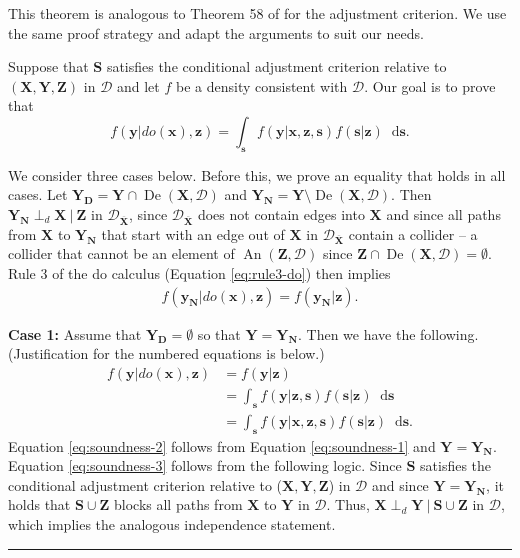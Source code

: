 \documentclass[twoside]{article}
\DeclareMathOperator{\An}{An}
\DeclareMathOperator{\De}{De}
\newcommand\given[1][]{\:#1\vert\:}
\newcommand{\mb}[1]{\mathbf{#1}}
\newcommand{\dsepp}{\perp_{d}}
\newcommand{\g}[1][G]{\mathcal{#1}}
\newcommand*\diff{\mathop{}\!\mathrm{d}}
\newenvironment{proofof}[1][]{\begin{trivlist}
\item[\hskip \labelsep {\bfseries Proof of #1.}]}{\hfill\BlackBox\end{trivlist}}
\newcommand{\BlackBox}{\rule{1.5ex}{1.5ex}}
\begin{document}
\begin{proofof}[Theorem \ref{thm:soundness}] 
    This theorem is analogous to Theorem 58 of \cite{perkovic2018complete} for the adjustment criterion. We use the same proof strategy and adapt the arguments to suit our needs.

    Suppose that $\mb{S}$ satisfies the conditional adjustment criterion relative to $(\mb{X,Y,Z})$ in $\g[D]$ and let $f$ be a density consistent with $\g[D]$. Our goal is to prove that
    \begin{equation}
        {f(\mb{y} | do(\mb{x}), \mb{z}) = \int_{\mb{s}} f(\mb{y} | \mb{x,z,s}) f(\mb{s} | \mb{z}) \diff \mb{s}.}
    \end{equation}

    We consider three cases below. Before this, we prove an equality that holds in all cases. Let $\mb{Y_D} = \mb{Y} \cap \De(\mb{X},\g[D])$ and $\mb{Y_N} = \mb{Y} \setminus \De(\mb{X}, \g[D])$. Then $\mb{Y_N} \dsepp \mb{X} \given \mb{Z}$ in $\g[D]_{\overline{\mb{X}}}$, since $\g[D]_{\overline{\mb{X}}}$ does not contain edges into $\mb{X}$ and since all paths from $\mb{X}$ to $\mb{Y_N}$ that start with an edge out of $\mb{X}$ in $\g[D]_{\overline{\mb{X}}}$ contain a collider -- a collider that cannot be an element of $\An(\mb{Z},\g[D])$ since $\mb{Z} \cap \De(\mb{X}, \g[D]) = \emptyset$. Rule 3 of the do calculus (Equation \eqref{eq:rule3-do}) then implies
    \begin{align}
        {f(\mb{y_N} | do(\mb{x}), \mb{z}) = f(\mb{y_N} | \mb{z}).} \label{eq:soundness-1}
    \end{align}


    \textbf{Case 1:} Assume that $\mb{Y_D} = \emptyset$ so that $\mb{Y} = \mb{Y_N}$. Then we have the following. (Justification for the numbered equations is below.)
    \begin{align}
        f(\mb{y} | do(\mb{x}) , \mb{z})
            &= f(\mb{y} | \mb{z}) \label{eq:soundness-2}\\
            &= \int_{\mb{s}} f(\mb{y} | \mb{z, s}) f(\mb{s} | \mb{z}) \diff \mb{s} \nonumber \\
            &= \int_{\mb{s}} f(\mb{y} | \mb{x, z, s}) f(\mb{s} | \mb{z}) \diff \mb{s}. \label{eq:soundness-3}
    \end{align}
    Equation \eqref{eq:soundness-2} follows from Equation \eqref{eq:soundness-1} and $\mb{Y} = \mb{Y_N}$. Equation \eqref{eq:soundness-3} follows from the following logic. Since $\mb{S}$ satisfies the conditional adjustment criterion relative to ($\mb{X,Y,Z}$) in $\g[D]$ and since $\mb{Y} = \mb{Y_N}$, it holds that $\mb{S} \cup \mb{Z}$ blocks all paths from $\mb{X}$ to $\mb{Y}$ in $\g[D]$. Thus, $\mb{X} \dsepp \mb{Y} \given \mb{S} \cup \mb{Z}$ in $\g[D]$, which implies the analogous independence statement.


\end{proofof}
\end{document}
